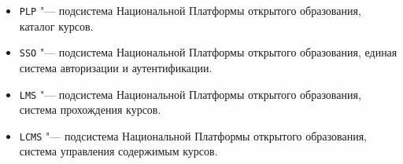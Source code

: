 \begin{itemize}
	\item \texttt{PLP} "--- подсистема Национальной Платформы открытого образования, каталог курсов.
	\item \texttt{SSO} "--- подсистема Национальной Платформы открытого образования, единая система авторизации и аутентификации.
	\item \texttt{LMS} "--- подсистема Национальной Платформы открытого образования, система прохождения курсов.
	\item \texttt{LCMS} "--- подсистема Национальной Платформы открытого образования, система управления содержимым курсов.
\end{itemize}